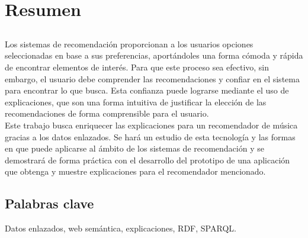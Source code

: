 \chapter*{Resumen}

\section*{\tituloPortadaVal}

Los sistemas de recomendación proporcionan a los usuarios opciones seleccionadas en base a sus preferencias, aportándoles una forma cómoda y rápida de encontrar elementos de interés. Para que este proceso sea efectivo, sin embargo, el usuario debe comprender las recomendaciones y confiar en el sistema para encontrar lo que busca. Esta confianza puede lograrse mediante el uso de explicaciones, que son una forma intuitiva de justificar la elección de las recomendaciones de forma comprensible para el usuario.\\

Este trabajo busca enriquecer las explicaciones para un recomendador de música gracias a los datos enlazados. Se hará un estudio de esta tecnología y las formas en que puede aplicarse al ámbito de los sistemas de recomendación y se demostrará de forma práctica con el desarrollo del prototipo de una aplicación que obtenga y muestre explicaciones para el recomendador mencionado.\\


\section*{Palabras clave}
   
\noindent Datos enlazados, web semántica, explicaciones, RDF, SPARQL.

   


